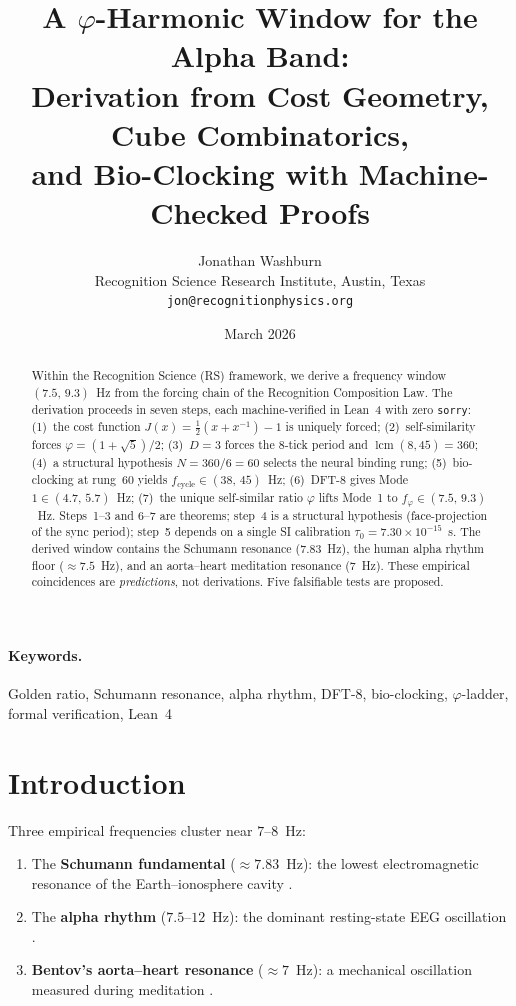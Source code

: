 \documentclass[11pt,a4paper]{article}
\title{A $\varphi$-Harmonic Window for the Alpha Band:\\
Derivation from Cost Geometry, Cube Combinatorics,\\
and Bio-Clocking with Machine-Checked Proofs}
\author{Jonathan Washburn\\
Recognition Science Research Institute, Austin, Texas\\
\texttt{jon@recognitionphysics.org}}
\date{March 2026}
\begin{document}
\maketitle

\begin{abstract}
Within the Recognition Science (RS) framework, we derive a frequency
window $(7.5,\,9.3)$~Hz from the forcing chain of the Recognition
Composition Law. The derivation proceeds in seven steps, each
machine-verified in Lean~4 with zero \texttt{sorry}: (1)~the cost
function $J(x)=\tfrac{1}{2}(x+x^{-1})-1$ is uniquely forced;
(2)~self-similarity forces $\varphi=(1+\sqrt{5})/2$; (3)~$D=3$
forces the 8-tick period and $\operatorname{lcm}(8,45)=360$;
(4)~a structural hypothesis $N=360/6=60$ selects the neural binding
rung; (5)~bio-clocking at rung~60 yields $f_{\mathrm{cycle}} \in
(38,\,45)$~Hz; (6)~DFT-8 gives Mode~$1\in(4.7,\,5.7)$~Hz;
(7)~the unique self-similar ratio $\varphi$ lifts Mode~1 to
$f_\varphi \in (7.5,\,9.3)$~Hz. Steps~1--3 and 6--7 are theorems;
step~4 is a structural hypothesis (face-projection of the sync
period); step~5 depends on a single SI calibration
$\tau_0=7.30\times10^{-15}$~s. The derived window contains the
Schumann resonance ($7.83$~Hz), the human alpha rhythm floor
($\approx 7.5$~Hz), and an aorta--heart meditation resonance ($7$~Hz).
These empirical coincidences are \emph{predictions}, not derivations.
Five falsifiable tests are proposed.
\end{abstract}

\paragraph{Keywords.} Golden ratio, Schumann resonance, alpha rhythm,
DFT-8, bio-clocking, $\varphi$-ladder, formal verification, Lean~4

\section{Introduction}
\label{sec:intro}

Three empirical frequencies cluster near $7$--$8$~Hz:
\begin{enumerate}[label=(\roman*)]
  \item The \textbf{Schumann fundamental} ($\approx 7.83$~Hz): the
    lowest electromagnetic resonance of the Earth--ionosphere cavity
    \citep{schumann1952,balser1960}.
  \item The \textbf{alpha rhythm} ($7.5$--$12$~Hz): the dominant
    resting-state EEG oscillation \citep{berger1929,klimesch1999}.
  \item \textbf{Bentov's aorta--heart resonance} ($\approx 7$~Hz):
    a mechanical oscillation measured during meditation
    \citep{bentov1977}.
\end{enumerate}
\end{document}

